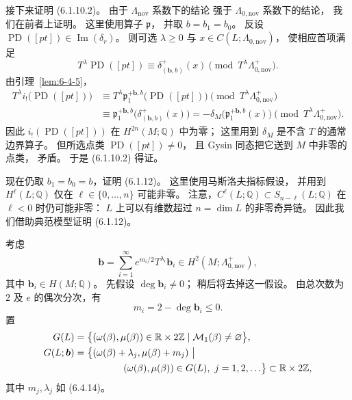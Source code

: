 接下来证明 (6.1.10.2)。
由于 $\Lambda_{\mathrm{nov}}$ 系数下的结论
强于 $\Lambda_{0,\mathrm{nov}}$ 系数下的结论，
我们在前者上证明。
这里使用算子 $\mathfrak p$，
并取 $b=b_1=b_0$。
反设
$\operatorname{PD}([pt])
\in\operatorname{Im}(\delta_r)$。
则可选 $\lambda\ge0$ 与
$x\in C(L;\Lambda_{0,\mathrm{nov}})$，
使相应首项满足
\[
T^\lambda\operatorname{PD}([pt])
\equiv\delta^+_{(\boldsymbol b,b)}(x)
\pmod{T^\lambda\Lambda_{0,\mathrm{nov}}^+}.
\]
由引理~\ref{lem:6-4-5}，
\[
\begin{aligned}
T^\lambda i_!\bigl(\operatorname{PD}([pt])\bigr)
&\equiv
T^\lambda\mathfrak p_1^{+\boldsymbol b,b}
\bigl(\operatorname{PD}([pt])\bigr)
\pmod{T^\lambda\Lambda_{0,\mathrm{nov}}^+}\\
&\equiv
\mathfrak p_1^{+\boldsymbol b,b}
\bigl(\delta^+_{(\boldsymbol b,b)}(x)\bigr)
=-\delta_M\bigl(
\mathfrak p_1^{+\boldsymbol b,b}(x)
\bigr)
\pmod{T^\lambda\Lambda_{0,\mathrm{nov}}^+}.
\end{aligned}
\]
因此 $i_!(\operatorname{PD}([pt]))$
在 $H^{2n}(M;\mathbb Q)$ 中为零；
这里用到 $\delta_M$ 是不含 $T$ 的通常边界算子。
但所选点类 $\operatorname{PD}([pt])\ne0$，
且 Gysin 同态把它送到 $M$ 中非零的点类，
矛盾。
于是 (6.1.10.2) 得证。

现在仍取 $b_1=b_0=b$，证明 (6.1.12)。
这里使用马斯洛夫指标假设，
并用到 $H^\ell(L;\mathbb Q)$
仅在 $\ell\in\{0,\ldots,n\}$
可能非零。
注意，$C^\ell(L;\mathbb Q)
\subset S_{n-\ell}(L;\mathbb Q)$
在 $\ell<0$ 时仍可能非零：
$L$ 上可以有维数超过
$n=\dim L$ 的非零奇异链。
因此我们借助典范模型证明 (6.1.12)。

考虑
\begin{equation}
\boldsymbol b
=\sum_{i=1}^{\infty}
e^{m_i/2}T^{\lambda_i}\boldsymbol b_i
\in H^2(M;\Lambda_{0,\mathrm{nov}}^+),
\tag{6.4.14}\label{eq:6-4-14}
\end{equation}
其中 $\boldsymbol b_i\in H(M;\mathbb Q)$。
先假设 $\deg\boldsymbol b_i\ne0$；
稍后将去掉这一假设。
由总次数为 $2$ 及 $e$ 的偶次分次，有
\begin{equation}
m_i=2-\deg\boldsymbol b_i\le0.
\tag{6.4.15}\label{eq:6-4-15}
\end{equation}
置
\[
\begin{aligned}
G(L)
&=\bigl\{(\omega(\beta),\mu(\beta))
\in\mathbb R\times2\mathbb Z
\mid\mathcal M_1(\beta)\ne\varnothing\bigr\},\\
G(L;\boldsymbol b)
&=\bigl\{(\omega(\beta)+\lambda_j,
\mu(\beta)+m_j)\ \big|\\
&\hspace{18mm}{}(\omega(\beta),\mu(\beta))\in G(L),
\ j=1,2,\ldots\bigr\}
\subset\mathbb R\times2\mathbb Z,
\end{aligned}
\]
其中 $m_j,\lambda_j$ 如 (6.4.14)。


